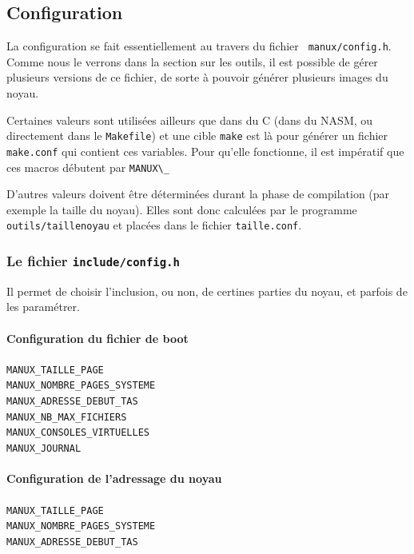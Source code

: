 \subsection{Configuration}

   La configuration se fait essentiellement au travers du fichier {\tt
manux/config.h}. Comme nous le verrons dans la section sur les outils,
il est possible de gérer plusieurs versions de ce fichier, de sorte à
pouvoir générer plusieurs images du noyau.

   Certaines valeurs sont utilisées ailleurs que dans du C (dans du NASM,
ou directement dans le {\tt Makefile}) et une cible  {\tt make} est là
pour générer un fichier {\tt make.conf} qui contient ces
variables. Pour qu'elle fonctionne, il est impératif que ces macros
débutent par \lstinline!MANUX\_!

   D'autres valeurs doivent être déterminées durant la phase de
compilation (par exemple la taille du noyau). Elles sont donc
calculées par le programme {\tt outils/taillenoyau} et placées dans le
fichier {\tt taille.conf}.

%
\subsubsection{Le fichier {\tt include/config.h}}

   Il permet de choisir l'inclusion, ou non, de certines parties du
noyau, et parfois de les paramétrer.

%
%
%
\paragraph{Configuration du fichier de boot}

\begin{description}
   \item[{\tt MANUX\_TAILLE\_PAGE}]
   \item[{\tt MANUX\_NOMBRE\_PAGES\_SYSTEME}]
   \item[{\tt MANUX\_ADRESSE\_DEBUT\_TAS}]
   \item[{\tt MANUX\_NB\_MAX\_FICHIERS}]
   \item[{\tt MANUX\_CONSOLES\_VIRTUELLES}]
   \item[{\tt MANUX\_JOURNAL}]
\end{description}

%
%
%
\paragraph{Configuration de l'adressage du noyau}
\begin{description}
   \item[{\tt MANUX\_TAILLE\_PAGE}]
   \item[{\tt MANUX\_NOMBRE\_PAGES\_SYSTEME}]
   \item[{\tt MANUX\_ADRESSE\_DEBUT\_TAS}]
\end{description}


